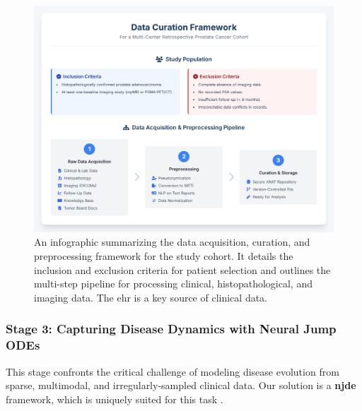 \documentclass[11pt, a4paper]{article}
\begin{document}
\begin{figure}[H]
    \centering
    \includegraphics[width=\textwidth]{dc.png}
    \caption{An infographic summarizing the data acquisition, curation, and preprocessing framework for the study cohort. It details the inclusion and exclusion criteria for patient selection and outlines the multi-step pipeline for processing clinical, histopathological, and imaging data. The \gls{ehr} is a key source of clinical data.}
    \label{fig:data_curation}
\end{figure}

\subsubsection{Stage 3: Capturing Disease Dynamics with Neural Jump ODEs}
This stage confronts the critical challenge of modeling disease evolution from sparse, multimodal, and irregularly-sampled clinical data. Our solution is a \textbf{\gls{njde}} framework, which is uniquely suited for this task \cite{GwakSim2020}.
\end{document}
